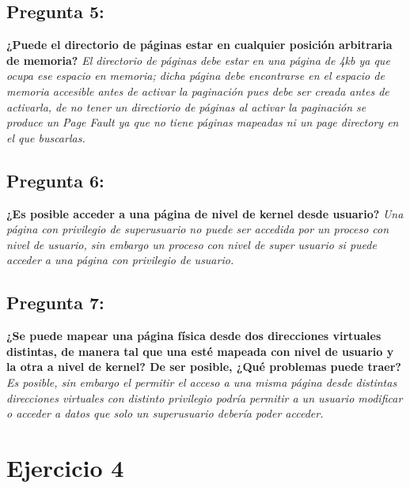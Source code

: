 \documentclass[10pt, a4paper]{article}
\begin{document}
{\subsection{Pregunta 5:}} \textbf{¿Puede el directorio de páginas estar en cualquier posición arbitraria de memoria?}\newline
\newline
\textit{
	El directorio de p\'aginas debe estar en una p\'agina de 4kb ya que ocupa ese espacio en memoria; dicha p\'agina debe encontrarse en el espacio de memoria accesible antes de activar la paginaci\'on pues debe ser creada antes de activarla, de no tener un directiorio de p\'aginas al activar la paginaci\'on se produce un Page Fault ya que no tiene p\'aginas mapeadas ni un page directory en el que buscarlas.
}
{\subsection{Pregunta 6:}} \textbf{¿Es posible acceder a una página de nivel de kernel desde usuario?}\newline
\newline
\textit{
	Una p\'agina con privilegio de superusuario no puede ser accedida por un proceso con nivel de usuario, sin embargo un proceso con nivel de super usuario si puede acceder a una p\'agina con privilegio de usuario.
}

{\subsection{Pregunta 7:}} \textbf{¿Se puede mapear una página física desde dos direcciones virtuales
distintas, de manera tal que una esté mapeada con nivel de usuario y la otra a nivel de kernel? De ser posible, ¿Qué problemas puede traer?}\newline
\newline
\textit{
	Es posible, sin embargo el permitir el acceso a una misma p\'agina desde distintas direcciones virtuales con distinto privilegio podr\'ia permitir a un usuario modificar o acceder a datos que solo un superusuario deber\'ia poder acceder.
}

\section{Ejercicio 4}
\end{document}
